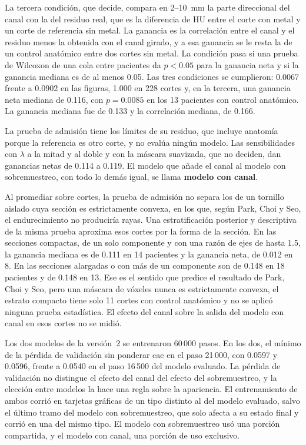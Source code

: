La tercera condición, que decide, compara en 2--10~mm la parte direccional del canal con la del residuo real, que es la diferencia de HU entre el corte con metal y un corte de referencia sin metal. La ganancia es la correlación entre el canal y el residuo menos la obtenida con el canal girado, y a esa ganancia se le resta la de un control anatómico entre dos cortes sin metal. La condición pasa si una prueba de Wilcoxon de una cola entre pacientes da $p < 0.05$ para la ganancia neta y si la ganancia mediana es de al menos 0.05. Las tres condiciones se cumplieron: 0.0067 frente a 0.0902 en las figuras, 1.000 en 228 cortes y, en la tercera, una ganancia neta mediana de 0.116, con $p = 0.0085$ en los 13 pacientes con control anatómico. La ganancia mediana fue de 0.133 y la correlación mediana, de 0.166.

La prueba de admisión tiene los límites de su residuo, que incluye anatomía porque la referencia es otro corte, y no evalúa ningún modelo. Las sensibilidades con $\lambda$ a la mitad y al doble y con la máscara suavizada, que no deciden, dan ganancias netas de 0.114 a 0.119. El modelo que añade el canal al modelo con sobremuestreo, con todo lo demás igual, se llama \textbf{modelo con canal}.

Al promediar sobre cortes, la prueba de admisión no separa los de un tornillo aislado cuya sección es estrictamente convexa, en los que, según Park, Choi y Seo, el endurecimiento no produciría rayas. Una estratificación posterior y descriptiva de la misma prueba aproxima esos cortes por la forma de la sección. En las secciones compactas, de un solo componente y con una razón de ejes de hasta 1.5, la ganancia mediana es de 0.111 en 14 pacientes y la ganancia neta, de 0.012 en 8. En las secciones alargadas o con más de un componente son de 0.148 en 18 pacientes y de 0.148 en 13. Ese es el sentido que predice el resultado de Park, Choi y Seo, pero una máscara de vóxeles nunca es estrictamente convexa, el estrato compacto tiene solo 11 cortes con control anatómico y no se aplicó ninguna prueba estadística. El efecto del canal sobre la salida del modelo con canal en esos cortes no se midió.

Los dos modelos de la versión~2 se entrenaron 60\,000 pasos. En los dos, el mínimo de la pérdida de validación sin ponderar cae en el paso 21\,000, con 0.0597 y 0.0596, frente a 0.0540 en el paso 16\,500 del modelo evaluado. La pérdida de validación no distingue el efecto del canal del efecto del sobremuestreo, y la elección entre modelos la hace una regla sobre la apariencia. El entrenamiento de ambos corrió en tarjetas gráficas de un tipo distinto al del modelo evaluado, salvo el último tramo del modelo con sobremuestreo, que solo afecta a su estado final y corrió en una del mismo tipo. El modelo con sobremuestreo usó una porción compartida, y el modelo con canal, una porción de uso exclusivo.

